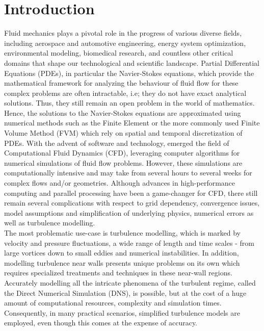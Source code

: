 \chapter{Introduction}
\label{chap:Introduction}
Fluid mechanics plays a pivotal role in the progress of various diverse fields, including aerospace and automotive engineering, energy system optimization, environmental modeling, biomedical research, and countless other critical domains that shape our technological and scientific landscape. Partial Differential Equations (PDEs), in particular the Navier-Stokes equations, which provide the mathematical framework for analyzing the behaviour of fluid flow for these complex problems are often intractable, i.e; they do not have exact analytical solutions. Thus, they still remain an open problem in the world of mathematics. Hence, the solutions to the Navier-Stokes equations are approximated using numerical methods such as the Finite Element or the more commonly used Finite Volume Method (FVM) which rely on spatial and temporal discretization of PDEs. With the advent of software and technology, emerged the field of Computational Fluid Dynamics (CFD), leveraging computer algorithms for numerical simulations of fluid flow problems. However, these simulations are computationally intensive and may take from several hours to several weeks for complex flows and/or geometries. Although advances in high-performance computing and parallel processing have been a game-changer for CFD, there still remain several complications with respect to grid dependency, convergence issues, model assumptions and simplification of underlying physics, numerical errors as well as turbulence modelling. \\
The most problematic use-case is turbulence modelling, which is marked by velocity and pressure fluctuations, a wide range of length and time scales - from large vortices down to small eddies and numerical instabilities. In addition, modelling turbulence near walls presents unique problems on its own which requires specialized treatments and techniques in these near-wall regions. Accurately modelling all the intricate phenomena of the turbulent regime, called the Direct Numerical Simulation (DNS), is possible, but at the cost of a huge amount of computational resources, complexity and simulation times. Consequently, in many practical scenarios, simplified turbulence models are employed, even though this comes at the expense of accuracy. \\
